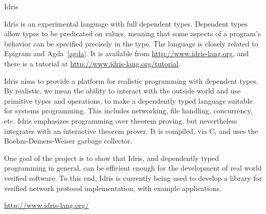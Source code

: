 \begin{hcarentry}[new]{Idris}
\makeheader

Idris is an experimental language with full dependent types.
Dependent types allow types to be predicated on values, meaning that
some aspects of a program's behavior can be specified precisely in
the type. The language is closely related to Epigram and Agda~\cref{agda}.
It is available from \url{http://www.idris-lang.org}, and there is a
tutorial at \url{http://www.idris-lang.org/tutorial}.

Idris aims to provide a platform for realistic programming with
dependent types. By realistic, we mean the ability to interact with
the outside world and use primitive types and operations, to make a
dependently typed language suitable for systems programming. This
includes networking, file handling, concurrency, etc.
Idris emphasizes programming over theorem proving, but nevertheless
integrates with an interactive theorem prover. It is compiled, via C,
and uses the Boehm-Demers-Weiser garbage collector.

One goal of the project is to show that Idris, and dependently typed
programming in general, can be efficient enough for the development of
real world verified software. To this end, Idris is currently being used
to develop a library for verified network protocol implementation,
with example applications.

\FurtherReading
  \url{http://www.idris-lang.org/}
\end{hcarentry}

